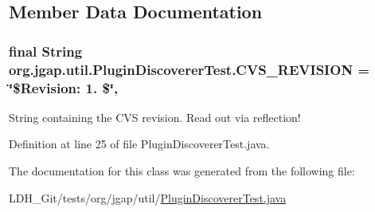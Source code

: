 \subsection{Member Data Documentation}
\hypertarget{classorg_1_1jgap_1_1util_1_1_plugin_discoverer_test_a798837306ff13b45028dbbe2974e74b4}{
\subsubsection[{C\-V\-S\-\_\-\-R\-E\-V\-I\-S\-I\-O\-N}]{\setlength{\rightskip}{0pt plus 5cm}final String org.\-jgap.\-util.\-Plugin\-Discoverer\-Test.\-C\-V\-S\-\_\-\-R\-E\-V\-I\-S\-I\-O\-N = \char`\"{}\$Revision\-: 1. \$\char`\"{}\hspace{0.3cm}{\ttfamily [static]}, {\ttfamily [private]}}}\label{classorg_1_1jgap_1_1util_1_1_plugin_discoverer_test_a798837306ff13b45028dbbe2974e74b4}
String containing the C\-V\-S revision. Read out via reflection! 

Definition at line 25 of file Plugin\-Discoverer\-Test.\-java.



The documentation for this class was generated from the following file\-:\begin{DoxyCompactItemize}
\item 
L\-D\-H\-\_\-\-Git/tests/org/jgap/util/\hyperlink{_plugin_discoverer_test_8java}{Plugin\-Discoverer\-Test.\-java}\end{DoxyCompactItemize}
